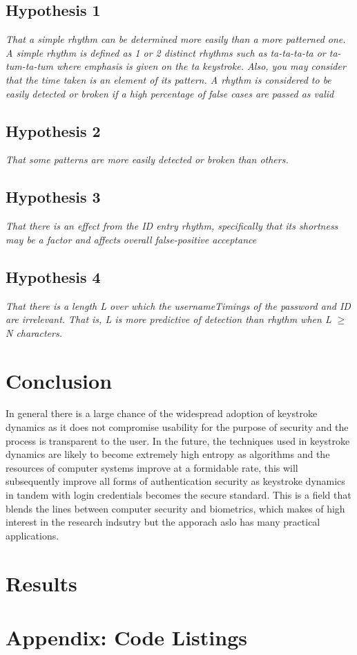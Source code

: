 \documentclass{article}
\begin{document}
\subsection{Hypothesis 1}
\begin{center}
\textit{ That a simple rhythm can be determined more easily than a more patterned one. A simple rhythm is defined as 1 or 2 distinct rhythms such as ta-ta-ta-ta or ta-tum-ta-tum where emphasis is given on the ta keystroke. Also, you may consider that the time taken is an element of its pattern. A rhythm is considered to be easily detected or broken if a high percentage of false cases are passed as valid}
\end{center}

\subsection{Hypothesis 2}
\begin{center}
\textit{That some patterns are more easily detected or broken than others.}
\end{center}

\subsection{Hypothesis 3}
\begin{center}
\textit{That there is an effect from the ID entry rhythm, specifically that its shortness may be a factor and affects overall false-positive acceptance}
\end{center}


\subsection{Hypothesis 4}
\begin{center}
\textit{That there is a length L over which the usernameTimings of the password and ID are
irrelevant. That is, L is more predictive of detection than rhythm when L $\geq$ N characters.}
\end{center}

\section{Conclusion}

In general there is a large chance of the widespread adoption of keystroke dynamics as it does not compromise usability for the purpose of security and the process is transparent to the user. In the future, the techniques used in keystroke dynamics are likely to become extremely high entropy as algorithms and the resources of computer systems improve at a formidable rate, this will subsequently improve all forms of authentication security as keystroke dynamics in tandem with login credentials becomes the secure standard. This is a field that blends the lines between computer security and biometrics, which makes of high interest in the research indsutry but the apporach aslo has many practical applications.  

\section{Results}

\section{Appendix: Code Listings} \label{appendix}

\medskip
\printbibliography
\end{document}
